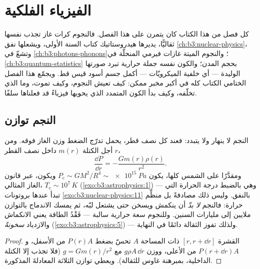 \chapter{الفيزياء الفلكية}\label{ch:b3:astrophysics}


كل فصل من هذا الكتاب كان يتمرن على هذا الفصل. فالنجوم
كرات غاز تجذب نفسها ثقاليًّا، يديرها هيدروستاتيك كتاب السنة
الأولى، ويشعلها نفق \cref{ch:b3:nuclear-physics}، وتشعّ
 في \cref{ch:b3:photons-phonons}؛ والنجوم الميتة
غازات فيرمي المنحلّة في \cref{ch:b3:quantum-statistics} بحجم
المدن؛ والكون نفسه جملة حرارية تبرد
صورتها الوليدة --- أي خلفية الميكرويّات --- أكمل
جسم أسود قيس قط. ويجمّع هذا الفصل الختامي الكتاب
كله في أكبر مخبر ممكن: كيف تعيش النجوم، وكيف
تموت، وما الذي تخلّفه، وكيف بدأ الكون المتمدد
الذي يحويها فيزياءً قد فعلناها سلفًا.

\section{النجم توازن}

\begin{proposition}\label{prop:b3:astrophysics:hydrostatic}
النجم لا ينهار ولا يتبدد: فعند كل نصف قطر، يحمل
تدرّج الضغط وزن الغاز فوقه. ومن أجل
الكتلة $m(r)$ داخل نصف القطر $r$،
\[
\frac{\dd P}{\dd r} = -\frac{Gm(r)\rho(r)}{r^2} .
\]
ومقدَّرًا على الشمس كلها، يكون $P_{\text{c}} \sim GM^2/R^4 \sim
\qty{e15}{Pa}$ ويكون، عبر قانون الغاز المثالي، $T_{\text{c}} \sim
10^7\,\unit{K}$ (\cref{exo:b3:astrophysics:1}) --- وهي بالضبط
درجة الحرارة التي تبدأ عندها بروتونات \cref{exo:b3:nuclear-physics:11}
بالنفق. وليس ذلك مصادفةً بل منظِّم حرارة: فالنجم
\emph{لا بدّ} أن ينكمش ويسخن حتى يشتعل لبّه، ثم يمسك الاندماج
بالتوازن ملايين إلى مليارات السنين. وللنجوم
سعة حرارية سالبة --- فَقْدُ الطاقة يعني الانكماش والازدياد
\emph{سخونةً} (\cref{exo:b3:astrophysics:5}) --- ولذلك
تفوز الثقالة دائمًا في النهاية.
\end{proposition}

\begin{proof}
القشرة $[r, r + \dd r]$ ذات المساحة $A$ تحسّ بضغط $P(r)A$ من
الأسفل، و $P(r + \dd r)A$ من الأعلى، ووزن $g\rho A\,\dd r$
مع $g = Gm(r)/r^2$ (فلا تجذب إلا الكتلة الداخلية، بمبرهنة
غاوس للثقالة). ويعطي توازن الثلاثة المعادلةَ
المذكورة.
\end{proof}

